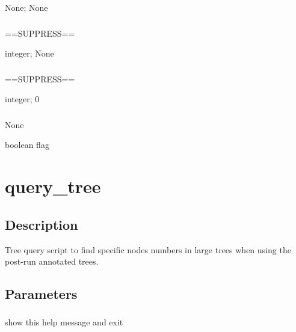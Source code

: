 \documentclass[letterpaper,12pt,english]{sphinxmanual}
\begin{document}
 None;  None


\subsubsection{}
\label{\detokenize{prog_desc:p-stopk}}
 ==SUPPRESS==

 integer;  None


\subsubsection{}
\label{\detokenize{prog_desc:s-startk}}
 ==SUPPRESS==

 integer;  0


\subsubsection{}
\label{\detokenize{prog_desc:id6}}
 None

 boolean flag


\section{query\_tree}
\label{\detokenize{prog_desc:query-tree}}

\subsection{Description}
\label{\detokenize{prog_desc:id7}}
Tree query script to find specific nodes numbers in large trees
when using the post-run annotated trees.



\subsection{Parameters}
\label{\detokenize{prog_desc:id8}}

\subsubsection{}
\label{\detokenize{prog_desc:id9}}
 show this help message and exit
\end{document}
